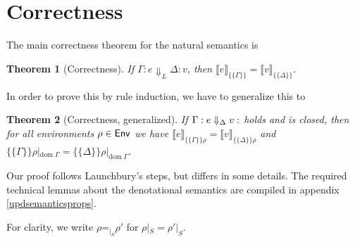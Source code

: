 \documentclass{jfp1}
\newtheorem{theorem}{Theorem}
\theoremstyle{nonumberbreak}
\newcommand{\sEnv}   {\text{\textsf{Env}}}
\newcommand{\sred}[5]{#1 : #2 \Downarrow_{#3} #4 : #5}
\newcommand{\sRule}[1]{\text{{\textsc{#1}}}}
\newcommand{\dom}[1]{\text{dom}\;#1}
\newcommand{\dsem}[2]{\llbracket #1 \rrbracket_{#2}}
\newcommand{\esem}[1]{\{\!\!\!\{#1\}\!\!\!\}}
\newcommand{\eqon}[1]{\mathrel{\mathord=_{\mathord|_{#1}}}}
\begin{document}
\section{Correctness}

The main correctness theorem for the natural semantics is
\begin{theorem}[Correctness]
If $\sred \Gamma e L \Delta v$, then $\dsem{e}{\esem{\Gamma}} = \dsem{v}{\esem{\Delta}}$.
\label{thm:main}
\end{theorem}

In order to prove this by rule induction, we have to generalize this to

\begin{theorem}[Correctness, generalized]
If $\sred \Gamma e \Delta v$ holds and is closed, then for all environments $\rho \in \sEnv$ we have $\dsem{e}{\esem{\Gamma}{\rho}} = \dsem{v}{\esem{\Delta}{\rho}}$ and $\esem\Gamma\rho|_{\dom\Gamma} = \esem\Delta\rho|_{\dom\Gamma}$.%
\label{thm:thm2}
\end{theorem}

Our proof follows Launchbury's steps, but differs in some details.
The required technical lemmas about the denotational semantics are compiled in appendix \ref{updsemanticsprops}.

For clarity, we write $\rho \eqon{S} \rho'$ for $\rho|_S = \rho'|_S$.
\end{document}
